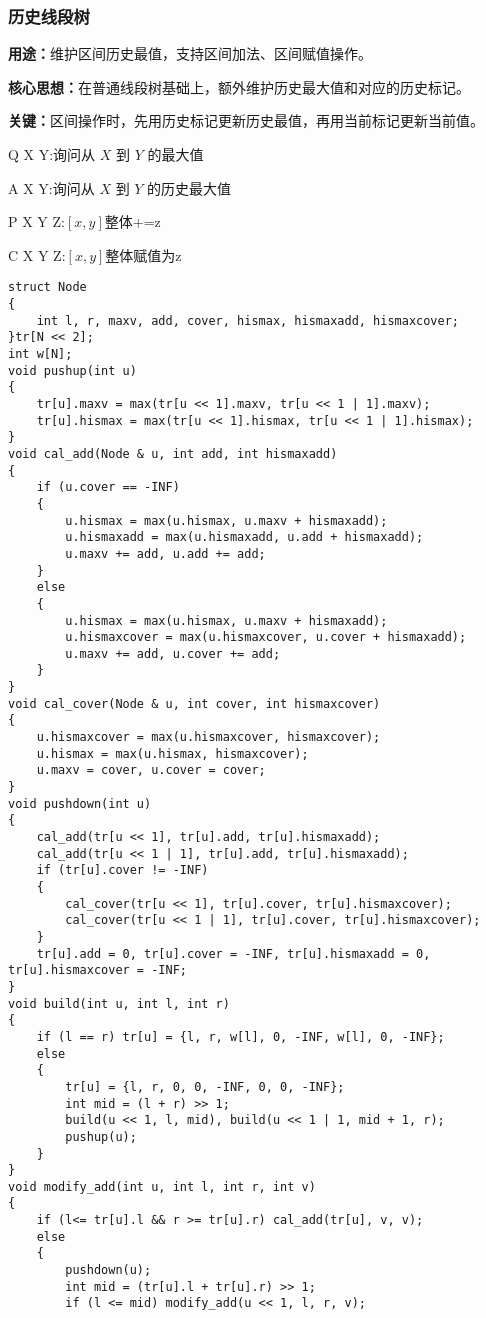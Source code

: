 \documentclass[a4paper, fontset=none]{ctexart}
\begin{document}
\subsubsection{历史线段树}
\textbf{用途：}维护区间历史最值，支持区间加法、区间赋值操作。

\textbf{核心思想：}在普通线段树基础上，额外维护历史最大值和对应的历史标记。

\textbf{关键：}区间操作时，先用历史标记更新历史最值，再用当前标记更新当前值。

Q X Y:询问从 $X$ 到 $Y$ 的最大值

A X Y:询问从 $X$ 到 $Y$ 的历史最大值

P X Y Z:$[x, y]$整体+=z

C X Y Z:$[x, y]$整体赋值为z

\begin{verbatim}
struct Node
{
    int l, r, maxv, add, cover, hismax, hismaxadd, hismaxcover;
}tr[N << 2];
int w[N];
void pushup(int u)
{
    tr[u].maxv = max(tr[u << 1].maxv, tr[u << 1 | 1].maxv);
    tr[u].hismax = max(tr[u << 1].hismax, tr[u << 1 | 1].hismax);
}
void cal_add(Node & u, int add, int hismaxadd)
{
    if (u.cover == -INF)
    {
        u.hismax = max(u.hismax, u.maxv + hismaxadd);
        u.hismaxadd = max(u.hismaxadd, u.add + hismaxadd);
        u.maxv += add, u.add += add;
    }
    else
    {
        u.hismax = max(u.hismax, u.maxv + hismaxadd);
        u.hismaxcover = max(u.hismaxcover, u.cover + hismaxadd);
        u.maxv += add, u.cover += add;
    }
}
void cal_cover(Node & u, int cover, int hismaxcover)
{
    u.hismaxcover = max(u.hismaxcover, hismaxcover);
    u.hismax = max(u.hismax, hismaxcover);
    u.maxv = cover, u.cover = cover;
}
void pushdown(int u)
{
    cal_add(tr[u << 1], tr[u].add, tr[u].hismaxadd);
    cal_add(tr[u << 1 | 1], tr[u].add, tr[u].hismaxadd);
    if (tr[u].cover != -INF)
    {
        cal_cover(tr[u << 1], tr[u].cover, tr[u].hismaxcover);
        cal_cover(tr[u << 1 | 1], tr[u].cover, tr[u].hismaxcover);
    }
    tr[u].add = 0, tr[u].cover = -INF, tr[u].hismaxadd = 0, tr[u].hismaxcover = -INF;
}
void build(int u, int l, int r)
{
    if (l == r) tr[u] = {l, r, w[l], 0, -INF, w[l], 0, -INF};
    else
    {
        tr[u] = {l, r, 0, 0, -INF, 0, 0, -INF};
        int mid = (l + r) >> 1;
        build(u << 1, l, mid), build(u << 1 | 1, mid + 1, r);
        pushup(u);
    }
}
void modify_add(int u, int l, int r, int v)
{
    if (l<= tr[u].l && r >= tr[u].r) cal_add(tr[u], v, v);
    else
    {
        pushdown(u);
        int mid = (tr[u].l + tr[u].r) >> 1;
        if (l <= mid) modify_add(u << 1, l, r, v);

\end{verbatim}
\end{document}
